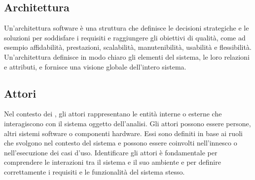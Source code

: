 \vspace{2em}
\subsection*{Architettura}
\par Un'architettura software è una struttura che definisce le decisioni strategiche e le soluzioni per soddisfare i requisiti e raggiungere gli obiettivi di qualità, come ad esempio affidabilità, prestazioni, scalabilità, manutenibilità, usabilità e flessibilità. Un'architettura definisce in modo chiaro gli elementi del sistema, le loro relazioni e attributi, e fornisce una visione globale dell'intero sistema.

\vspace{2em}
\subsection*{Attori}
\par Nel contesto dei , gli attori rappresentano le entità interne o esterne che interagiscono con il sistema oggetto dell'analisi. Gli attori possono essere persone, altri sistemi software o componenti hardware. Essi sono definiti in base ai ruoli che svolgono nel contesto del sistema e possono essere coinvolti nell'innesco o nell'esecuzione dei casi d'uso. Identificare gli attori è fondamentale per comprendere le interazioni tra il sistema e il suo ambiente e per definire correttamente i requisiti e le funzionalità del sistema stesso.
